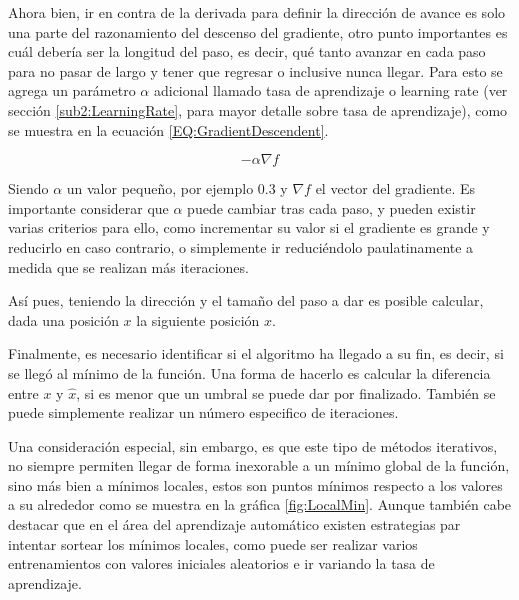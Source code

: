         Ahora bien, ir en contra de la derivada para definir la dirección de avance es solo una parte del razonamiento del descenso del gradiente, otro punto importantes es cuál debería ser la longitud del paso, es decir, qué tanto avanzar en cada paso para no pasar de largo y tener que regresar o inclusive nunca llegar. Para esto se agrega un parámetro $\alpha$ adicional llamado tasa de aprendizaje o learning rate (ver sección \ref{sub2:LearningRate}, para mayor detalle sobre tasa de aprendizaje), como se muestra en la ecuación \ref{EQ:GradientDescendent}.

        \begin{equation}
            \label{EQ:GradientDescendent}
            -\alpha \nabla f
        \end{equation}
        
        Siendo $\alpha$ un valor pequeño, por ejemplo 0.3 y $\nabla f$ el vector del gradiente. Es importante considerar que $\alpha$ puede cambiar tras cada paso, y pueden existir varias criterios para ello, como incrementar su valor si el gradiente es grande y reducirlo en caso contrario, o simplemente ir reduciéndolo paulatinamente a medida que se realizan más iteraciones.
        
        Así pues, teniendo la dirección y el tamaño del paso a dar es posible calcular, dada una posición $x$ la siguiente posición $\hat{x}$.
        
        Finalmente, es necesario identificar si el algoritmo ha llegado a su fin, es decir, si se llegó al mínimo de la función. Una forma de hacerlo es calcular la diferencia entre $x$ y $\hat{x}$, si es menor que un umbral se puede dar por finalizado. También se puede simplemente realizar un número especifico de iteraciones.
        
        Una consideración especial, sin embargo, es que este tipo de métodos iterativos, no siempre permiten llegar de forma inexorable a un mínimo global de la función, sino más bien a mínimos locales, estos son puntos mínimos respecto a los valores a su alrededor como se muestra en la gráfica \ref{fig:LocalMin}. Aunque también cabe destacar que en el área del aprendizaje automático existen estrategias par intentar sortear los mínimos locales, como puede ser realizar varios entrenamientos con valores iniciales aleatorios e ir variando la tasa de aprendizaje.
 
